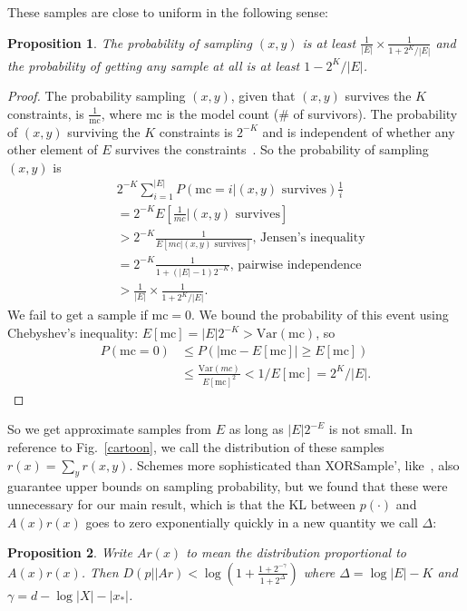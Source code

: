 \documentclass{article}
\newtheorem{proposition}{Proposition}
\begin{document}
  These samples are close to uniform in the following sense: %
  \begin{proposition}\label{propositionLowerBound}
    The probability of sampling $(x,y)$ is at least $\frac{1}{|E|}\times \frac{1}{1 + 2^K/|E|}$ and the probability of getting any sample at all is at least $1 - 2^{K}/|E|$.
  \end{proposition}
  \begin{proof}
    The probability sampling $(x,y)$, given that $(x,y)$ survives the $K$ constraints,
    is $\frac{1}{\text{mc}}$, where $\text{mc}$ is the model count (\# of survivors).
    The probability of $(x,y)$ surviving the $K$ constraints is $2^{-K}$ and is independent of whether any other element of $E$ survives the constraints~\cite{gomes2006near}.
    So the probability of sampling $(x,y)$ is
    \begin{align}
      &      2^{-K}\sum_{i = 1}^{|E|} P(\text{mc} = i | (x,y) \text{ survives})\frac{1}{i}\\
      & = 2^{-K} E[\frac{1}{mc} | (x,y) \text{ survives} ] \\
      &> 2^{-K} \frac{1}{E[mc|(x,y) \text{ survives}]}\text{, Jensen's inequality}\\
      &= 2^{-K} \frac{1}{1 + (|E|-1)2^{-K}}\text{, pairwise independence}\\
      &> \frac{1}{|E|}\times \frac{1}{1 + 2^K/|E|}.
      \end{align}
    We fail to get a sample if $\text{mc} = 0$. We bound the probability of this event using Chebyshev's inequality: $E[\text{mc}] = |E|2^{-K}>\text{Var}(\text{mc})$, so
    \begin{align}
      P(\text{mc}= 0)&\leq P(|\text{mc}-E[\text{mc}]|\geq E[\text{mc}])\\
      &\leq \frac{\text{Var}(mc)}{E[\text{mc}]^2}<1/E[\text{mc}] = 2^K/|E|.
    \end{align}
  \end{proof}
  So we get approximate samples from $E$ as long as $|E|2^{-E}$ is not small.
  In reference to Fig.~\ref{cartoon},
  we call the distribution of these samples $r(x)=\sum_y r(x,y)$.
  Schemes more sophisticated than XORSample', like~\cite{ermon2013embed}, also guarantee upper bounds on sampling probability, but we found that these were unnecessary for our main result, which is that the KL between $p(\cdot )$ and $A(x)r(x)$ goes to zero exponentially quickly in a new quantity we call $\Delta$:
  \begin{proposition}\label{mainResult}
    Write $Ar(x)$ to mean the distribution  proportional to $A(x)r(x)$. Then $D(p||Ar)<\log \left( 1 + \frac{1 + 2^{ - \gamma}}{1 + 2^\Delta}\right)$ where
    $\Delta = \log |E| - K$ and $\gamma = d - \log |X| - |x_*|$.
  \end{proposition}
\end{document}
